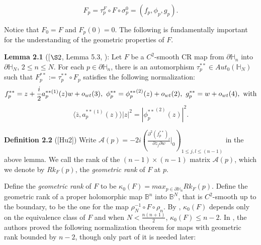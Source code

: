 \documentclass[12pt]{article}
\def\h{\hbox}
\numberwithin{equation}{section}
\def\BB{{\mathbb B}}
\def\HH{{\mathbb H}}
\def\h{\hbox}
\def\h{\hbox}
\begin{document}
\begin {equation}
F_p=\tau^F_p\circ F\circ \sigma^0_p=(f_p,\phi_p,g_p).
\label{eqn:nor01}
\end{equation}

  Notice that
$F_0=F$ and $F_p(0)=0$. The following is fundamentally important for
the understanding of the geometric properties of $F$.

\medskip
{\bf Lemma 2.1} ([$\S 2$, Lemma 5.3, \cite{Hu1}):
    Let $F$ be a $C^2$-smooth CR map
from  $\partial\HH_n$ into $\partial\HH_N$, $2\le n\le N$. For each
$p\in \partial \HH_n$, there is an automorphism $\tau^{**}_p\in
  {Aut}_0({\HH}_N)$ such that
$F_{p}^{**}:=\tau^{**}_p\circ F_p$ satisfies the following
normalization:
$$f^{**}_{p}=z+{\frac{i}{ 2}}a^{**(1)}_{p}(z)w+o_{wt}(3),\ \phi_p^{**}
={\phi_p^{**}}^{(2)}(z)+o_{wt}(2), \ g^{**}_{p}=w+o_{wt}(4),\
\hbox{with}$$
$$\langle \overline{z}, a_{p}^{**(1)}(z)\rangle
|z|^2=|{\phi_p^{**}}^{(2)}(z)|^2.$$

{\bf Definition 2.2} ([Hu2]) Write
$\mathcal{A}(p)=-2i(\frac{\partial^2(f^{\ast\ast}_p)
  _l}{\partial z_j\partial w}|_0)_{1\leq j,l\leq (n-1)}$ in the above
lemma. We call the rank
  of the $(n-1)\times (n-1)$ matrix  $\mathcal{A}(p)$, which we denote by
  $Rk_F(p)$, the {\it geometric rank} of $F$ at $p$.

\medskip
Define the {\it geometric rank} of $F$ to be $\kappa_0(F)=max_{p\in
  \partial\HH_n} Rk_F(p)$.
  Define the
geometric rank of a proper holomorphic map ${\BB}^n$ into ${\BB}^N$,
that is $C^2$-smooth up to the boundary, to be the one for the map
$\rho_N^{-1}\circ F \circ \rho_n.$
By \cite{Hu2}, $\kappa_0(F)$ depends only on the equivalence class of $F$
and when $N<\frac{n(n+1)}{2}$,  $\kappa_0(F)\le n-2$.
In \cite{HJX1}, the authors proved the following normalization theorem
for maps with geometric rank bounded by $n-2$, though only part of
it is needed later:
\end{document}
